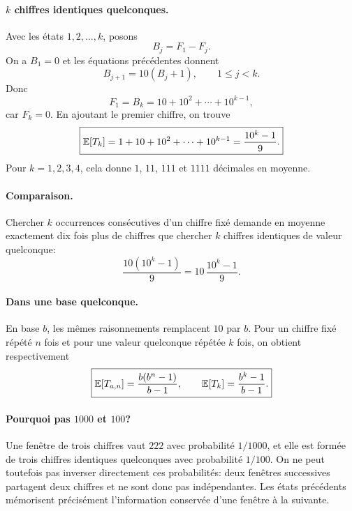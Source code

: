 \documentclass[11pt,a4paper]{article}
\begin{document}
\paragraph{$k$ chiffres identiques quelconques.}
Avec les états $1,2,\ldots,k$, posons
\[
B_j=F_1-F_j.
\]
On a $B_1=0$ et les équations précédentes donnent
\[
B_{j+1}=10(B_j+1),
\qquad 1\leq j<k.
\]
Donc
\[
F_1=B_k=10+10^2+\cdots+10^{k-1},
\]
car $F_k=0$. En ajoutant le premier chiffre, on trouve
\[
\boxed{
\mathbb E[T_k]
=1+10+10^2+\cdots+10^{k-1}
=\frac{10^k-1}{9}.}
\]
Pour $k=1,2,3,4$, cela donne $1$, $11$, $111$ et $1111$ décimales en
moyenne.

\paragraph{Comparaison.}
Chercher $k$ occurrences consécutives d'un chiffre fixé demande en moyenne
exactement dix fois plus de chiffres que chercher $k$ chiffres identiques de
valeur quelconque:
\[
\frac{10(10^k-1)}9
=10\,\frac{10^k-1}{9}.
\]

\paragraph{Dans une base quelconque.}
En base $b$, les mêmes raisonnements remplacent $10$ par $b$. Pour un chiffre
fixé répété $n$ fois et pour une valeur quelconque répétée $k$ fois, on obtient
respectivement
\[
\boxed{
\mathbb E[T_{a,n}]=\frac{b(b^n-1)}{b-1},
\qquad
\mathbb E[T_k]=\frac{b^k-1}{b-1}.}
\]

\paragraph{Pourquoi pas $1000$ et $100$?}
Une fenêtre de trois chiffres vaut $222$ avec probabilité $1/1000$, et elle
est formée de trois chiffres identiques quelconques avec probabilité $1/100$.
On ne peut toutefois pas inverser directement ces probabilités: deux fenêtres
successives partagent deux chiffres et ne sont donc pas indépendantes. Les
états précédents mémorisent précisément l'information conservée d'une fenêtre
à la suivante.
\end{document}
